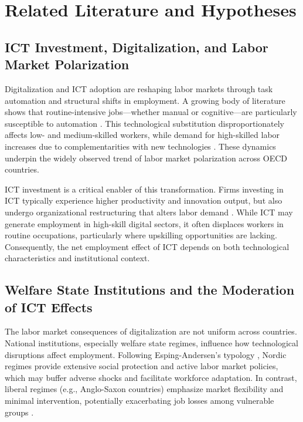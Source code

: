 \section{Related Literature and Hypotheses}

\subsection{ICT Investment, Digitalization, and Labor Market Polarization}

Digitalization and ICT adoption are reshaping labor markets through task automation and structural 
shifts in employment. A growing body of literature shows that routine-intensive jobs—whether manual 
or cognitive—are particularly susceptible to automation \parencite{frey2013thefuture, 
goos2014explaining}. This technological substitution disproportionately affects low- and 
medium-skilled workers, while demand for high-skilled labor increases due to complementarities with 
new technologies \parencite{autor2013thegrowth, autor2015whyare}. These dynamics underpin the widely 
observed trend of labor market polarization across OECD countries.

ICT investment is a critical enabler of this transformation. Firms investing in ICT typically 
experience higher productivity and innovation output, but also undergo organizational restructuring 
that alters labor demand \parencite{corrado2018intangible, brynjolfsson2014thesecond}. While ICT may 
generate employment in high-skill digital sectors, it often displaces workers in routine occupations, 
particularly where upskilling opportunities are lacking. Consequently, the net employment effect of 
ICT depends on both technological characteristics and institutional context.

\subsection{Welfare State Institutions and the Moderation of ICT Effects}

The labor market consequences of digitalization are not uniform across countries. National 
institutions, especially welfare state regimes, influence how technological disruptions affect 
employment. Following Esping-Andersen’s typology \parencite{espingandersen1990thethree}, Nordic 
regimes provide extensive social protection and active labor market policies, which may buffer 
adverse shocks and facilitate workforce adaptation. In contrast, liberal regimes (e.g., Anglo-Saxon 
countries) emphasize market flexibility and minimal intervention, potentially exacerbating job 
losses among vulnerable groups \parencite{hall2001varieties}.

